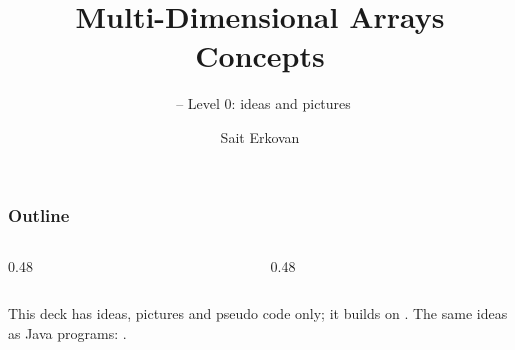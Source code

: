 \documentclass[aspectratio=169,10pt,compress]{beamer}
\title[Arrays ND: Concepts]{
	Multi-Dimensional Arrays\\
	Concepts
}
\subtitle{
	\cisOOO\ -- Level 0: ideas and pictures
}
\author[Erkovan]{Sait Erkovan}
\institute[FCIS]{
	Faculty of Computer and Information Sciences\\
	Yeditepe University
}
\date{{\tiny \hbTimeStamp}}
\begin{document}
\begin{frame}[t,fragile]
	\titlepage
\end{frame}




\begin{frame}[t,fragile] \frametitle{Outline}
	\begin{columns}[T]
		\begin{column}{0.48\textwidth}
			\tableofcontents[sections={1-4}, hideallsubsections]
		\end{column}
		\begin{column}{0.48\textwidth}
			\tableofcontents[sections={5-7}, hideallsubsections]
		\end{column}
	\end{columns}

	\vspace{1em}
	\small This deck has ideas, pictures and pseudo code only; it builds on .
	The same ideas as Java programs: .
\end{frame}




\end{document}
